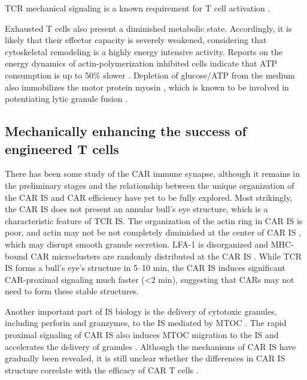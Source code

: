 TCR mechanical signaling is a known requirement for T cell activation \cite{Hu2016}.

Exhausted T cells also present a diminished metabolic state. Accordingly, it is likely that their effector capacity is severely weakened, considering that cytoskeletal remodeling is a highly energy intensive activity. Reports on the energy dynamics of actin-polymerization inhibited cells indicate that ATP consumption is up to 50\% slower \cite{Bernstein2002, Ahmed2015}. Depletion of glucose/ATP from the medium also immobilizes the motor protein myosin \cite{Xu2014}, which is known to be involved in potentiating lytic granule fusion \cite{Basu2016}.

\subsection{Mechanically enhancing the success of engineered T cells}

There has been some study of the CAR immune synapse, although it remains in the preliminary stages and the relationship between the unique organization of the CAR IS and CAR efficiency have yet to be fully explored. Most strikingly, the CAR IS does not present an annular bull's eye structure, which is a characteristic feature of TCR IS.  The organization of the actin ring in CAR IS is poor, and actin may not be not completely diminished at the center of CAR IS \cite{Xiong2018}, which may disrupt smooth granule secretion. LFA-1 is disorganized and MHC-bound CAR microclusters are randomly distributed at the CAR IS \cite{Davenport2019}. While TCR IS forms a bull's eye's structure in  5–10 min, the CAR IS induces significant CAR-proximal signaling much faster (\textless 2 min), suggesting that CARs may not need to form these stable structures. 

Another important part of IS biology is the delivery of cytotoxic granules, including perforin and granzymes, to the IS mediated by MTOC \cite{Mukherjee2017}. The rapid proximal signaling of CAR IS also induces  MTOC migration to the IS and accelerates the delivery of granules \cite{Davenport2019}. Although the mechanisms of CAR IS have gradually been revealed, it is still unclear whether the differences in CAR IS structure correlate with the efficacy of CAR T cells \cite{Li2020, Watanabe2018}. 


